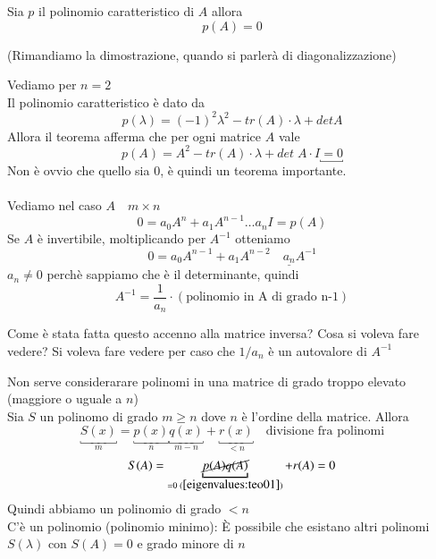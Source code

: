 \begin{theo}
\label{eigenvalues:teo01} 
 Sia $p$ il polinomio caratteristico di $A$ allora
 $$ p(A) = 0$$
\end{theo}
\begin{thproof}
 (Rimandiamo la dimostrazione, quando si parler\`a di diagonalizzazione) 
\end{thproof}
Vediamo per $n = 2$ \\
Il polinomio caratteristico \`e dato da
$$ p(\lambda) = (-1)^{2} \lambda^{2} - tr(A)\cdot \lambda + detA $$
Allora il teorema afferma che per ogni matrice $A$ vale
$$p(A) = A^2 - tr(A) \cdot \lambda + det\; A \cdot I \underbracket{ = 0
} $$
Non \`e ovvio che quello sia 0, \`e quindi un teorema importante.
 \\ \\
Vediamo nel caso $A \quad m \times n$
\begin{equation}
\label{eigenvalues:eq002} 0 = a_{0}A^{n} + a_1 A ^{n-1} \ldots a_{n}I  =  p(A)
\end{equation}
Se $A$ \`e invertibile, moltiplicando per $A^{-1}$ otteniamo
$$ 0 = a_0 A^{n-1} + a_1 A^{n-2} \quad \underline{a_n}A^{-1}$$
$a_n \neq 0$ perch\`e sappiamo che \`e il determinante, quindi
$$ A^{-1} = \frac{1}{a_n}\cdot \left( \text{polinomio in A di grado n-1} \right) $$
\begin{openquestion}
Come \`e stata fatta questo accenno alla matrice inversa?
Cosa si voleva fare vedere? Si voleva fare vedere per
caso che $1/a_{n}$ \`e un autovalore di $A^{-1}$
\end{openquestion}
Non serve considerarare polinomi in una matrice di grado troppo elevato
 (maggiore o uguale a $n$) \\
Sia $S$ un polinomo di grado $m \geq n$ dove $n$ \`e l'ordine della matrice.
Allora 
$$ \underbracket{S(x)}_{m}  = \underbracket{p(x)}_{n}\underbracket{q(x)}_{m-n} + \underbracket{r(x)}_{< n} \quad \text{divisione fra polinomi} $$
$$S(A) = \underbracket{\cancel{p(A) q(A)}}_{=0 \;(\ref{eigenvalues:teo01})} + r(A) = 0$$
Quindi abbiamo un polinomio di grado $< n$ \\
C'\`e un polinomio (polinomio minimo): \`E possibile che esistano altri
 polinomi $S(\lambda)$
con $S(A) = 0$ e grado minore di $n$
